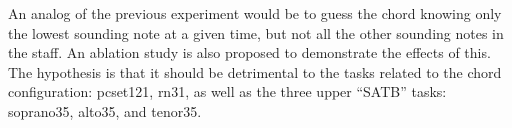 
An analog of the previous experiment would be to guess the
chord knowing only the lowest sounding note at a given time,
but not all the other sounding notes in the staff. An
ablation study is also proposed to demonstrate the effects
of this. The hypothesis is that it should be detrimental to
the tasks related to the chord configuration:
\gls{pcset121}, \gls{rn31}, as well as the three upper
``SATB'' tasks: \gls{soprano35}, \gls{alto35}, and
\gls{tenor35}.
